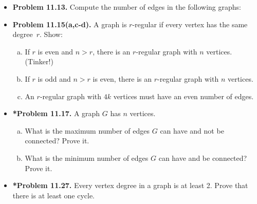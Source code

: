 \documentclass[11pt]{article}
\begin{document}
\begin{itemize}
\vspace{0.1in}

\item \textbf{Problem 11.13.}
Compute the number of edges in the following graphs:
\begin{enumerate}[(a)]
\end{enumerate}

\newpage

\item \textbf{Problem 11.15(a,c-d).}
A graph is $r$-regular if every vertex has the same degree~$r$. Show:
\begin{enumerate}[(a)]
\item If $r$ is even and $n>r$, there is an $r$-regular graph with $n$ vertices. (Tinker!)
\setcounter{enumi}{2}
\item If $r$ is odd and $n>r$ is even, there is an $r$-regular graph with $n$ vertices.
\item An $r$-regular graph with $4k$ vertices must have an even number of edges.
\end{enumerate}

\vspace{0.1in}

\item \textbf{*Problem 11.17.}
A graph $G$ has $n$ vertices.
\begin{enumerate}[(a)]
\item What is the maximum number of edges $G$ can have and not be connected? Prove it.
\item What is the minimum number of edges $G$ can have and be connected? Prove it.
\end{enumerate}

\vspace{0.1in}

\item \textbf{*Problem 11.27.}
Every vertex degree in a graph is at least 2.
Prove that there is at least one cycle.

\end{itemize}
\end{document}
